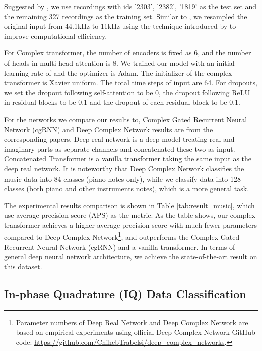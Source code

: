 \documentclass{article}
\begin{document}
Suggested by \cite{thickstun2016learning}, we use recordings with ids ’2303’, ’2382’, ’1819’ as the test set and the remaining 327 recordings as the training set. Similar to \cite{trabelsi2017deep}, we resampled the original input from 44.1kHz to 11kHz using the technique introduced by \cite{smith2002} to improve computational efficiency. 

For Complex transformer, the number of encoders is fixed as 6, and the number of heads in multi-head attention is 8. We trained our model with an initial learning rate of  and the optimizer is Adam. The initializer of the complex transformer is Xavier uniform. The total time steps of input are 64. For dropouts, we set the dropout following self-attention to be 0, the dropout following ReLU in residual blocks to be 0.1 and the dropout of each residual block to be 0.1. 

For the networks we compare our results to, Complex Gated Recurrent Neural Network (cgRNN) \cite{wolter2018complex} and Deep Complex Network \cite{trabelsi2017deep} results are from the corresponding papers. Deep real network is a deep model treating real and imaginary parts as separate channels and concatenated these two as input. Concatenated Transformer is a vanilla transformer taking the same input as the deep real network. It is noteworthy that Deep Complex Network \cite{trabelsi2017deep} classifies the music data into 84 classes (piano notes only), while we classify data into 128 classes (both piano and other instruments notes), which is a more general task.  

The experimental results comparison is shown in Table \ref{tab:result_music}, which use average precision score (APS) as the metric. As the table shows, our complex transformer achieves a higher average precision score with much fewer parameters compared to Deep Complex Network\footnote{Parameter numbers of Deep Real Network and Deep Complex Network are based on empirical experiments using official Deep Complex Network GitHub code: \url{https://github.com/ChihebTrabelsi/deep_complex_networks}.}, and outperforms the Complex Gated Recurrent Neural Network (cgRNN) \cite{wolter2018complex} and a vanilla transformer. In terms of general deep neural network architecture, we achieve the state-of-the-art result on this dataset.

\subsection{In-phase Quadrature (IQ) Data Classification}
\end{document}
